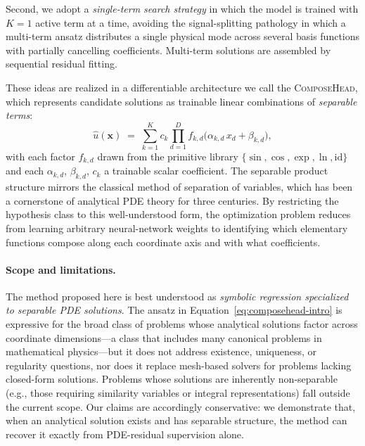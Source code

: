 Second, we adopt a \emph{single-term search strategy} in which the model is
trained with $K=1$ active term at a time, avoiding the signal-splitting
pathology in which a multi-term ansatz distributes a single physical mode across
several basis functions with partially cancelling coefficients.  Multi-term
solutions are assembled by sequential residual fitting.

These ideas are realized in a differentiable architecture we call the
\textsc{ComposeHead}, which represents candidate solutions as trainable linear
combinations of \emph{separable terms}:
\begin{equation}
  \label{eq:composehead-intro}
  \hat{u}(\mathbf{x}) \;=\; \sum_{k=1}^{K} c_k \prod_{d=1}^{D}
    f_{k,d}\!\bigl(\alpha_{k,d}\, x_d + \beta_{k,d}\bigr),
\end{equation}
with each factor $f_{k,d}$ drawn from the primitive library
$\{\sin,\cos,\exp,\ln,\mathrm{id}\}$ and each $\alpha_{k,d}$, $\beta_{k,d}$,
$c_k$ a trainable scalar coefficient.  The separable product structure mirrors
the classical method of separation of variables, which has been a cornerstone of
analytical PDE theory for three centuries.  By restricting the hypothesis class
to this well-understood form, the optimization problem reduces from learning
arbitrary neural-network weights to identifying which elementary functions
compose along each coordinate axis and with what coefficients.

\paragraph{Scope and limitations.}
The method proposed here is best understood as \emph{symbolic regression
specialized to separable PDE solutions}.  The ansatz in
Equation~\eqref{eq:composehead-intro} is expressive for the broad class of
problems whose analytical solutions factor across coordinate dimensions---a
class that includes many canonical problems in mathematical physics---but it
does not address existence, uniqueness, or regularity questions, nor does it
replace mesh-based solvers for problems lacking closed-form solutions.  Problems
whose solutions are inherently non-separable (e.g., those requiring similarity
variables or integral representations) fall outside the current scope.  Our
claims are accordingly conservative: we demonstrate that, when an analytical
solution exists and has separable structure, the method can recover it exactly
from PDE-residual supervision alone.


